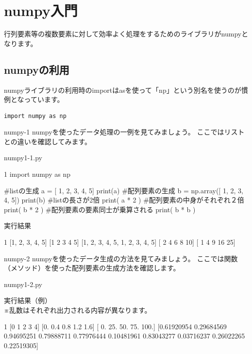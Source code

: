 \section{numpy入門}
行列要素等の複数要素に対して効率よく処理をするためのライブラリがnumpyとなります。
\subsection{numpyの利用}

numpyライブラリの利用時のimportはasを使って「np」という別名を使うのが慣例となっています。

\begin{verbatim}
import numpy as np
\end{verbatim}


\begin{pabox}{numpy-1}
numpyを使ったデータ処理の一例を見てみましょう。
ここではリストとの違いを確認してみます。

\begin{legbox}{numpy1-1.py}
\begin{listing}{1}
import numpy as np

#listの生成
a = [ 1, 2, 3, 4, 5]
print(a)
#配列要素の生成
b = np.array([ 1, 2, 3, 4, 5])
print(b)
#listの長さが2倍
print( a * 2 )
#配列要素の中身がそれぞれ２倍
print( b * 2 )
#配列要素の要素同士が乗算される
print( b * b )
\end{listing}

実行結果\\
\begin{listing}{1}
[1, 2, 3, 4, 5]
[1 2 3 4 5]
[1, 2, 3, 4, 5, 1, 2, 3, 4, 5]
[ 2  4  6  8 10]
[ 1  4  9 16 25]
\end{listing}
\end{legbox}

\end{pabox}

\begin{pabox}{numpy-2}
numpyを使ったデータ生成の方法を見てみましょう。
ここでは関数（メソッド）を使った配列要素の生成方法を確認します。

\begin{legbox}{numpy1-2.py}

実行結果（例）\\
※乱数はそれぞれ出力される内容が異なります。\\
\begin{listing}{1}
[0 1 2 3 4]
[0.  0.4 0.8 1.2 1.6]
[  0.  25.  50.  75. 100.]
[0.61920954 0.29684569 0.94695251 0.79888711 0.77976444 0.10481961
 0.83043277 0.03716237 0.26022265 0.22519305]
\end{listing}
\end{legbox}

\end{pabox}

